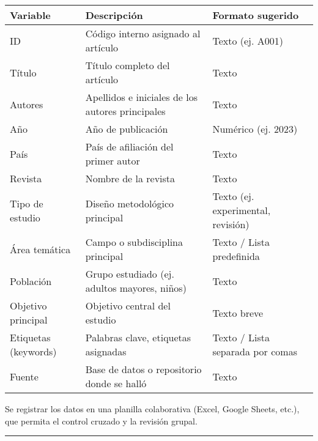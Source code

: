 \documentclass[
  letterpaper,
]{book}
\begin{document}
\begin{longtable}[]{@{}
  >{\raggedright\arraybackslash}p{}
  >{\raggedright\arraybackslash}p{}
  >{\raggedright\arraybackslash}p{}@{}}
\toprule\noalign{}
\begin{minipage}[b]{\linewidth}\raggedright
Variable
\end{minipage} & \begin{minipage}[b]{\linewidth}\raggedright
Descripción
\end{minipage} & \begin{minipage}[b]{\linewidth}\raggedright
Formato sugerido
\end{minipage} \\
\midrule\noalign{}
\endhead
\bottomrule\noalign{}
\endlastfoot
ID & Código interno asignado al artículo & Texto (ej. A001) \\
Título & Título completo del artículo & Texto \\
Autores & Apellidos e iniciales de los autores principales & Texto \\
Año & Año de publicación & Numérico (ej. 2023) \\
País & País de afiliación del primer autor & Texto \\
Revista & Nombre de la revista & Texto \\
Tipo de estudio & Diseño metodológico principal & Texto (ej.
experimental, revisión) \\
Área temática & Campo o subdisciplina principal & Texto / Lista
predefinida \\
Población & Grupo estudiado (ej. adultos mayores, niños) & Texto \\
Objetivo principal & Objetivo central del estudio & Texto breve \\
Etiquetas (keywords) & Palabras clave, etiquetas asignadas & Texto /
Lista separada por comas \\
Fuente & Base de datos o repositorio donde se halló & Texto \\
\end{longtable}

Se registrar los datos en una planilla colaborativa (Excel, Google
Sheets, etc.), que permita el control cruzado y la revisión grupal.

\begin{center}\rule{0.5\linewidth}{0.5pt}\end{center}
\end{document}
